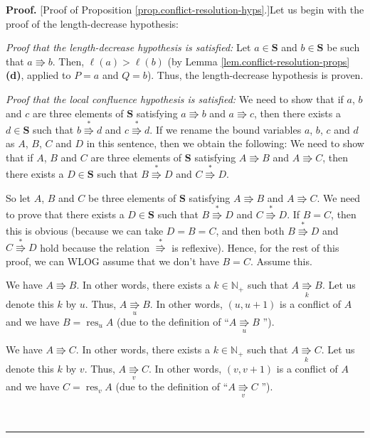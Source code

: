 \documentclass[numbers=enddot,12pt,final,onecolumn,notitlepage]{scrartcl}%
\theoremstyle{definition}
\newenvironment{proof}[1][Proof]{\noindent\textbf{#1.} }{\ \rule{0.5em}{0.5em}}
\newenvironment{verlong}{}{}
\begin{document}
\begin{verlong}
\begin{proof}
[Proof of Proposition \ref{prop.conflict-resolution-hyps}.]Let us begin with
the proof of the length-decrease hypothesis:

\textit{Proof that the length-decrease hypothesis is satisfied:} Let
$a\in\mathbf{S}$ and $b\in\mathbf{S}$ be such that $a\Rrightarrow b$. Then,
$\ell\left(  a\right)  >\ell\left(  b\right)  $ (by Lemma
\ref{lem.conflict-resolution-props} \textbf{(d)}, applied to $P=a$ and $Q=b$).
Thus, the length-decrease hypothesis is proven.

\textit{Proof that the local confluence hypothesis is satisfied:} We need to
show that if $a$, $b$ and $c$ are three elements of $\mathbf{S}$ satisfying
$a\Rrightarrow b$ and $a\Rrightarrow c$, then there exists a $d\in\mathbf{S}$
such that $b\overset{\ast}{\Rrightarrow}d$ and $c\overset{\ast}{\Rrightarrow
}d$. If we rename the bound variables $a$, $b$, $c$ and $d$ as $A$, $B$, $C$
and $D$ in this sentence, then we obtain the following: We need to show that
if $A$, $B$ and $C$ are three elements of $\mathbf{S}$ satisfying
$A\Rrightarrow B$ and $A\Rrightarrow C$, then there exists a $D\in\mathbf{S}$
such that $B\overset{\ast}{\Rrightarrow}D$ and $C\overset{\ast}{\Rrightarrow
}D$.

So let $A$, $B$ and $C$ be three elements of $\mathbf{S}$ satisfying
$A\Rrightarrow B$ and $A\Rrightarrow C$. We need to prove that there exists a
$D\in\mathbf{S}$ such that $B\overset{\ast}{\Rrightarrow}D$ and
$C\overset{\ast}{\Rrightarrow}D$. If $B=C$, then this is obvious (because we
can take $D=B=C$, and then both $B\overset{\ast}{\Rrightarrow}D$ and
$C\overset{\ast}{\Rrightarrow}D$ hold because the relation $\overset{\ast
}{\Rrightarrow}$ is reflexive). Hence, for the rest of this proof, we can WLOG
assume that we don't have $B=C$. Assume this.

We have $A\Rrightarrow B$. In other words, there exists a $k\in\mathbb{N}_{+}$
such that $A\underset{k}{\Rrightarrow}B$. Let us denote this $k$ by $u$. Thus,
$A\underset{u}{\Rrightarrow}B$. In other words, $\left(  u,u+1\right)  $ is a
conflict of $A$ and we have $B=\operatorname*{res}\nolimits_{u}A$ (due to the
definition of \textquotedblleft$A\underset{u}{\Rrightarrow}B$%
\textquotedblright).

We have $A\Rrightarrow C$. In other words, there exists a $k\in\mathbb{N}_{+}$
such that $A\underset{k}{\Rrightarrow}C$. Let us denote this $k$ by $v$. Thus,
$A\underset{v}{\Rrightarrow}C$. In other words, $\left(  v,v+1\right)  $ is a
conflict of $A$ and we have $C=\operatorname*{res}\nolimits_{v}A$ (due to the
definition of \textquotedblleft$A\underset{v}{\Rrightarrow}C$%
\textquotedblright).


\end{proof}
\end{verlong}
\end{document}
